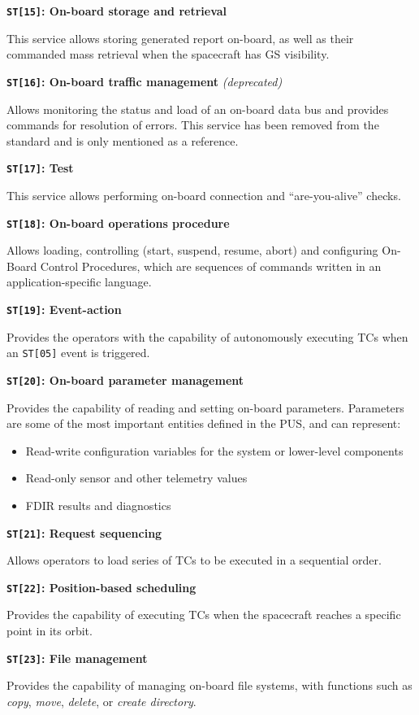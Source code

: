 \documentclass[a4paper,nobib]{tufte-book}
\begin{document}
\begin{compactitem}
	\item \textbf{\texttt{ST[15]}: On-board storage and retrieval}
	
	This service allows storing generated report on-board, as well as their commanded mass retrieval when the spacecraft has \acl{GS} visibility.
	
	\item \textbf{\texttt{ST[16]}: On-board traffic management} \emph{(deprecated)}
	
	Allows monitoring the status and load of an on-board data bus and provides commands for resolution of errors. This service has been removed from the standard and is only mentioned as a reference.
	
	\item \textbf{\texttt{ST[17]}: Test}
	
	This service allows performing on-board connection and ``are-you-alive'' checks.
	
	\item \textbf{\texttt{ST[18]}: On-board operations procedure}
	
	Allows loading, controlling (start, suspend, resume, abort) and configuring On-Board Control Procedures, which are sequences of commands written in an application-specific language.
	
	\item \textbf{\texttt{ST[19]}: Event-action}
	
	Provides the operators with the capability of autonomously executing \acp{TC} when an \texttt{ST[05]} event is triggered.
	
	\item \textbf{\texttt{ST[20]}: On-board parameter management}
	
	Provides the capability of reading and setting on-board parameters. Parameters are some of the most important entities defined in the \acs{PUS}, and can represent:
	\begin{itemize}
		\item Read-write configuration variables for the system or lower-level components
		\item Read-only sensor and other telemetry values
		\item \ac{FDIR} results and diagnostics
	\end{itemize}
	
	\item \textbf{\texttt{ST[21]}: Request sequencing}
	
	Allows operators to load series of \acp{TC} to be executed in a sequential order.
	
	\item \textbf{\texttt{ST[22]}: Position-based scheduling}
	
	Provides the capability of executing \acp{TC} when the spacecraft reaches a specific point in its orbit.
	
	\item \textbf{\texttt{ST[23]}: File management}
	
	Provides the capability of managing on-board file systems, with functions such as \emph{copy}, \emph{move}, \emph{delete}, or \emph{create directory}.
\end{compactitem}
\end{document}
